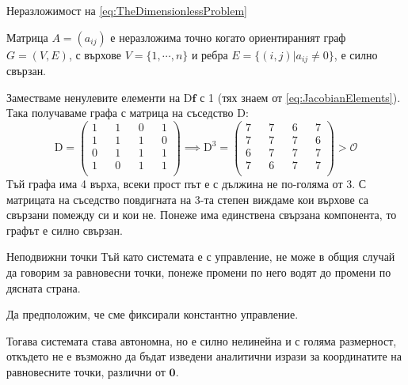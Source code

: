   \begin{frame}[t]{Неразложимост на \ref{eq:TheDimensionlessProblem}}
  \begin{theorem}
  \label{theorem:ConnectedIrreducability}
  Матрица $A=(a_{ij})$ е неразложима точно когато ориентираният граф $G=(V,E)$, с върхове $V=\{1, \cdots, n\}$ и ребра $E=\{(i,j) \vert a_{ij} \neq 0 \}$, е силно свързан.
  \end{theorem}

  Заместваме ненулевите елементи на $\mathrm{D} \boldsymbol{f}$ с 1 (тях знаем от \ref{eq:JacobianElements}). Така получаваме графа с матрица на съседство $\mathrm{D}$:
  \begin{equation}
  \mathrm{D} =
  \begin{pmatrix}
    1 && 1 && 0 && 1 \\
    1 && 1 && 1 && 0 \\
    0 && 1 && 1 && 1 \\
    1 && 0 && 1 && 1 \\
  \end{pmatrix}
  \implies
  \mathrm{D}^3 =
  \begin{pmatrix}
    7 && 7 && 6 && 7 \\
    7 && 7 && 7 && 6 \\
    6 && 7 && 7 && 7 \\
    7 && 6 && 7 && 7 \\
  \end{pmatrix}
  >
  \mathscr{O}
  \end{equation}
  Тъй графа има 4 върха, всеки прост път е с дължина не по-голяма от 3.
  С матрицата на съседство повдигната на 3-та степен виждаме кои върхове са свързани помежду си и кои не.
  Понеже има единствена свързана компонента, то графът е силно свързан.
  \end{frame}

\begin{frame}[t]{Неподвижни точки}
  Тъй като системата е с управление, не може в общия случай да говорим за равновесни точки, понеже промени по него водят до промени по дясната страна.

  Да предположим, че сме фиксирали константно управление.

Тогава системата става автономна, но е силно нелинейна и с голяма размерност, откъдето не е възможно да бъдат изведени аналитични изрази за координатите на равновесните точки, различни от $\boldsymbol{0}$.
\end{frame}

